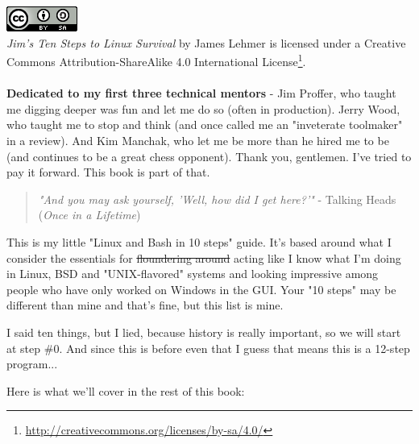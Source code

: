 \documentclass[10pt,]{book}
\renewcommand{\href}[2]{#2\footnote{\url{#1}}}
\numberwithin{figure}{chapter}
\begin{document}
~\\\hspace*{0.333em}\\
\includegraphics{./images/cc-by-sa.png}\\\emph{Jim's Ten Steps to Linux
Survival} by James Lehmer is licensed under a
\href{http://creativecommons.org/licenses/by-sa/4.0/}{Creative Commons
Attribution-ShareAlike 4.0 International License}.
~\\\hspace*{0.333em}\\ \textbf{Dedicated to my first three technical
mentors} - Jim Proffer, who taught me digging deeper was fun and let me
do so (often in production). Jerry Wood, who taught me to stop and think
(and once called me an "inveterate toolmaker" in a review). And Kim
Manchak, who let me be more than he hired me to be (and continues to be
a great chess opponent). Thank you, gentlemen. I've tried to pay it
forward. This book is part of that.

\pagestyle{fancy} \fancyhead{}
\fancyhead[RO]{\slshape \leftmark} \renewcommand{\headrulewidth}{0.4pt}


\begin{quote}
\emph{"And you may ask yourself, 'Well, how did I get here?'"} - Talking
Heads (\emph{Once in a Lifetime})
\end{quote}

This is my little "Linux and Bash in 10 steps" guide. It's based around
what I consider the essentials for \sout{floundering around} acting like
I know what I'm doing in Linux, BSD and "UNIX-flavored" systems and
looking impressive among people who have only worked on Windows in the
GUI. Your "10 steps" may be different than mine and that's fine, but
this list is mine.

I said ten things, but I lied, because history is really important, so
we will start at step \#0. And since this is before even that I guess
that means this is a 12-step program...

Here is what we'll cover in the rest of this book:
\end{document}
